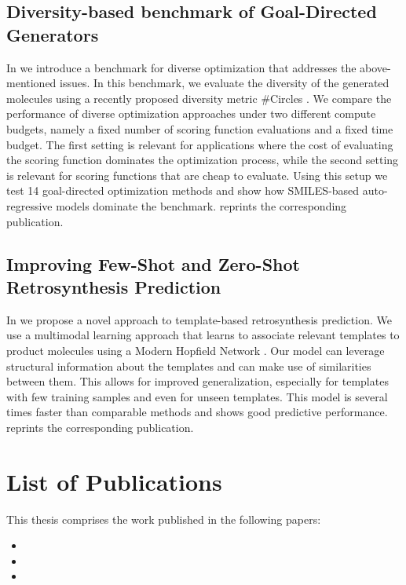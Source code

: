 \subsection{Diversity-based benchmark of Goal-Directed Generators\label{sec:divopt}}
In \citep{renzBenchmarkingEfficiencyGenerative2024} we introduce a benchmark for
diverse optimization that addresses the above-mentioned issues. In this
benchmark, we evaluate the diversity of the generated molecules using a recently
proposed diversity metric \#Circles \citep{xieHowMuchSpace2023}. We compare the
performance of diverse optimization approaches under two different compute
budgets, namely a fixed number of scoring function evaluations and a fixed time
budget. The first setting is relevant for applications where the cost of
evaluating the scoring function dominates the optimization process, while the
second setting is relevant for scoring functions that are cheap to evaluate.
Using this setup we test 14 goal-directed optimization methods and show how
SMILES-based auto-regressive models dominate the benchmark.
 reprints the corresponding publication.

\subsection{Improving Few-Shot and Zero-Shot Retrosynthesis Prediction}
In \citep{seidlImprovingFewZeroShot2022} we propose a novel approach to
template-based retrosynthesis prediction. We use a multimodal learning approach
that learns to associate relevant templates to product molecules using a Modern
Hopfield Network \citep{ramsauerHopfieldNetworksAll2020}. Our model can leverage
structural information about the templates and can make use of similarities
between them. This allows for improved generalization, especially for templates
with few training samples and even for unseen templates. This model is several
times faster than comparable methods and shows good predictive performance.
 reprints the corresponding publication.

\section{List of Publications\label{sec:publications}}
This thesis comprises the work published in the following papers:

\begin{itemize}
    \item {}
    \item {}
    \item {}
\end{itemize}



